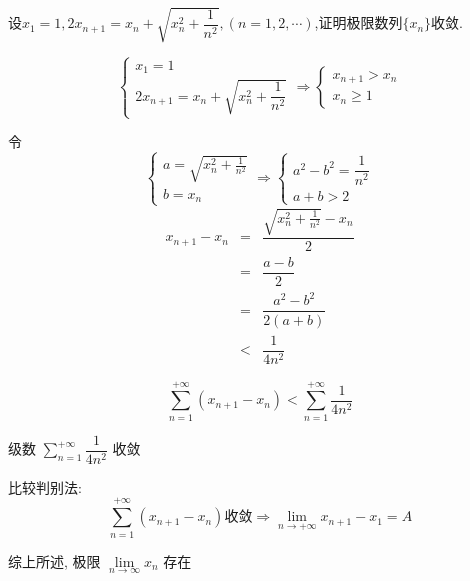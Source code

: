 \begin{proposition}
	设$x_{1}=1,2x_{n+1}=x_{n}+\sqrt{x_{n}^2+\dfrac{1}{n^2}},(n=1,2,\cdots)$,证明极限数列$\{x_{n}\}$收敛.
\end{proposition}
\begin{solution}

	$$\begin{cases}
		x_{1} = 1 \\ 
		2x_{n+1} = x_{n} + \sqrt{x_{n}^{2}+\dfrac{1}{n^{2}}}
	\end{cases}\Rightarrow
	\begin{cases}
		x_{n+1} > x_{n} \\
		x_{n} \geq 1
	\end{cases} $$

	令 $$\begin{cases}
		a = \sqrt{x_{n}^{2}+\frac{1}{n^{2}}}\\
		b = x_{n}
	\end{cases}\Rightarrow
	\begin{cases}
		a^{2} -b^{2} = \dfrac{1}{n^{2}}\\
		a + b > 2
	\end{cases}$$
	\begin{eqnarray*}
		x_{n+1} - x_{n} & = & \dfrac{\sqrt{x_{n}^{2}+\frac{1}{n^{2}}}-x_{n}}{2} \\
						& = & \dfrac{a-b}{2}\\
						& = & \dfrac{a^{2}-b^{2}}{2(a+b)}\\
						& < & \dfrac{1}{4n^{2}}
	\end{eqnarray*}

	$$\sum\limits_{n=1}^{+\infty}(x_{n+1}-x_{n}) < \sum\limits_{n=1}^{+\infty}\dfrac{1}{4n^{2}}$$

	级数 $\sum\limits_{n=1}^{+\infty}\dfrac{1}{4n^{2}}$ 收敛

	比较判别法:
	$$\sum\limits_{n=1}^{+\infty}(x_{n+1}-x_{n})\text{收敛}\Rightarrow \lim\limits_{n\to +\infty}x_{n+1} - x_{1} = A$$
	
	综上所述, 极限 $\lim\limits_{n\rightarrow\infty}x_{n}$ 存在
\end{solution}

